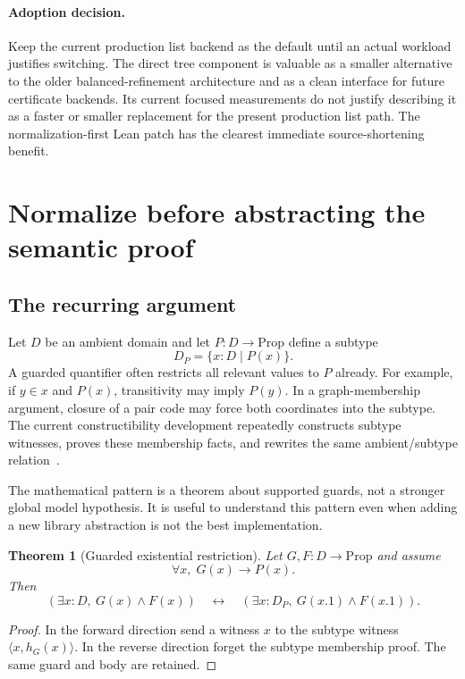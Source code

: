 \documentclass[11pt]{article}
\newtheorem{theorem}{Theorem}[section]
\theoremstyle{remark}\newtheorem{remark}[theorem]{Remark}
\begin{document}
\paragraph{Adoption decision.}
Keep the current production list backend as the default until an actual workload justifies switching. The direct tree component is valuable as a smaller alternative to the older balanced-refinement architecture and as a clean interface for future certificate backends. Its current focused measurements do not justify describing it as a faster or smaller replacement for the present production list path. The normalization-first Lean patch has the clearest immediate source-shortening benefit.

\section{Normalize before abstracting the semantic proof}

\subsection{The recurring argument}
Let $D$ be an ambient domain and let $P:D\to\mathrm{Prop}$ define a subtype
\[
 D_P=\{x:D\mid P(x)\}.
\]
A guarded quantifier often restricts all relevant values to $P$ already. For example, if $y\in x$ and $P(x)$, transitivity may imply $P(y)$. In a graph-membership argument, closure of a pair code may force both coordinates into the subtype. The current constructibility development repeatedly constructs subtype witnesses, proves these membership facts, and rewrites the same ambient/subtype relation~\cite{constructibleabs}.

The mathematical pattern is a theorem about supported guards, not a stronger global model hypothesis. It is useful to understand this pattern even when adding a new library abstraction is not the best implementation.

\begin{theorem}[Guarded existential restriction]
Let $G,F:D\to\mathrm{Prop}$ and assume
\[
 \forall x,\;G(x)\to P(x).
\]
Then
\[
 (\exists x:D,\ G(x)\wedge F(x))
 \quad\longleftrightarrow\quad
 (\exists x:D_P,\ G(x.1)\wedge F(x.1)).
\]
\end{theorem}
\begin{proof}
In the forward direction send a witness $x$ to the subtype witness $\langle x,h_G(x)\rangle$. In the reverse direction forget the subtype membership proof. The same guard and body are retained.
\end{proof}
\end{document}
